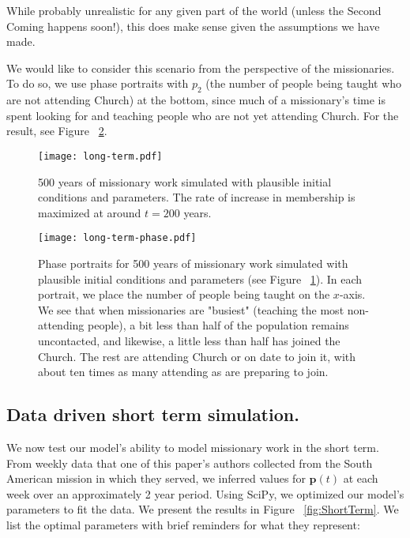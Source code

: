 \documentclass[11pt]{amsart}
\begin{document}
While probably unrealistic for any given part of the world (unless the Second Coming happens soon!), this does make sense given the assumptions we have made.

We would like to consider this scenario from the perspective of the missionaries. To do so, we use phase portraits with $p_2$ (the number of people being taught who are not attending Church) at the bottom, since much of a missionary's time is spent looking for and teaching people who are not yet attending Church. For the result, see Figure ~\ref{fig:LongTermPhase}.

\begin{figure}[htb]
\begin{center} %
\texttt{[image: long-term.pdf]}
\end{center}
\caption{500 years of missionary work simulated with plausible initial conditions and parameters. The rate of increase in membership is maximized at around $t = 200$ years.}
\label{fig:LongTerm}
\end{figure}

\begin{figure}[htb]
\begin{center} %
\texttt{[image: long-term-phase.pdf]}
\end{center}
\caption{Phase portraits for 500 years of missionary work simulated with plausible initial conditions and parameters (see Figure ~\ref{fig:LongTerm}). In each portrait, we place the number of people being taught on the $x$-axis. We see that when missionaries are "busiest" (teaching the most non-attending people), a bit less than half of the population remains uncontacted, and likewise, a little less than half has joined the Church. The rest are attending Church or on date to join it, with about ten times as many attending as are preparing to join.}
\label{fig:LongTermPhase}
\end{figure}

\begin{samepage}
\subsection*{Data driven short term simulation.}
\begin{center}
\hspace{0pt}
\end{center}

We now test our model's ability to model missionary work in the short term. From weekly data that one of this paper's authors collected from the South American mission in which they served, we inferred values for $\boldsymbol{p}(t)$ at each week over an approximately 2 year period. Using SciPy, we optimized our model's parameters to fit the data. We present the results in Figure ~\ref{fig:ShortTerm}. We list the optimal parameters with brief reminders for what they represent:
\end{samepage}
\end{document}
